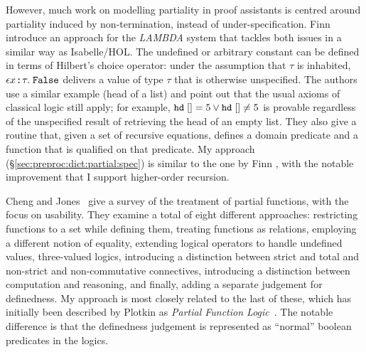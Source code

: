However, much work on modelling partiality in proof assistants is centred around partiality induced by non-termination, instead of under-specification.
Finn \etal~\cite{finn1997partial} introduce an approach for the \emph{LAMBDA} system that tackles both issues in a similar way as Isabelle/HOL.
The undefined or arbitrary constant can be defined in terms of Hilbert's choice operator: under the assumption that $\tau$ is inhabited, $\epsilon x \mathbin{:\!\!:} \tau.\;\texttt{\textup{False}}$ delivers a value of type $\tau$ that is otherwise unspecified.
The authors use a similar example (head of a list) and point out that the usual axioms of classical logic still apply; for example, $\texttt{\textup{hd}}\;[] = 5 \vee \texttt{\textup{hd}}\;[] \neq 5$ is provable regardless of the unspecified result of retrieving the head of an empty list.
They also give a routine that, given a set of recursive equations, defines a domain predicate and a function that is qualified on that predicate.
My approach (§\ref{sec:preproc:dict:partial:spec}) is similar to the one by Finn \etal, with the notable improvement that I support higher-order recursion.

Cheng and Jones~\cite{cheng1991usability} give a survey of the treatment of partial functions, with the focus on usability.
They examine a total of eight different approaches:
restricting functions to a set while defining them,
treating functions as relations,
employing a different notion of equality,
extending logical operators to handle undefined values,
three-valued logics,
introducing a distinction between strict and total and non-strict and non-commutative connectives,
introducing a distinction between computation and reasoning, and finally,
adding a separate judgement for definedness.
My approach is most closely related to the last of these, which has initially been described by Plotkin as \emph{Partial Function Logic}~\cite[§9]{cheng1991usability}.
The notable difference is that the definedness judgement is represented as ``normal'' boolean predicates in the logics.

